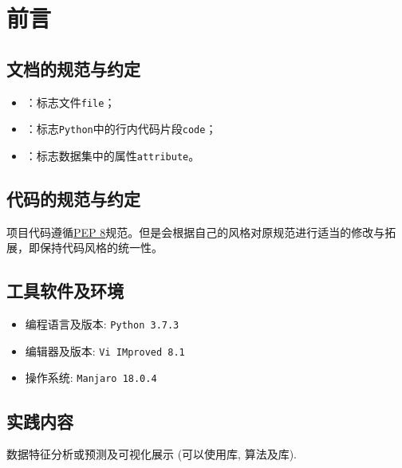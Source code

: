 \section{前言}
\subsection{文档的规范与约定}
\begin{itemize}
	\item {}：标志文件\texttt{file}；
	\item {}：标志\texttt{Python}中的行内代码片段\texttt{code}；
	\item {}：标志数据集中的属性\texttt{attribute}。
\end{itemize}

\subsection{代码的规范与约定}
项目代码遵循\href{https://www.python.org/dev/peps/pep-0008/}{PEP 8}规范。但是会根据自己的风格对原规范进行适当的修改与拓展，即保持代码风格的统一性。

\subsection{工具软件及环境}
\begin{itemize}
    \item 编程语言及版本: \texttt{Python 3.7.3}
    \item 编辑器及版本: \texttt{Vi IMproved 8.1}
    \item 操作系统: \texttt{Manjaro 18.0.4}
\end{itemize}

\subsection{实践内容}
数据特征分析或预测及可视化展示 (可以使用库, 算法及库).
